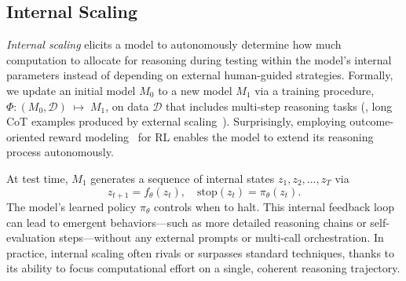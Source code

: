 \subsection{Internal Scaling}
\label{subsec:internalsclaing}
\textit{Internal scaling} elicits a model to autonomously determine how much computation to allocate for reasoning during testing within the model's internal parameters instead of depending on external human-guided strategies.
Formally, we update an initial model $M_{0}$ to a new model $M_{1}$ via a training procedure, $\Phi : (M_{0}, \mathcal{D}) \;\mapsto\; M_{1}$, on data $\mathcal{D}$ that includes multi-step reasoning tasks (\eg, long CoT examples produced by external scaling~\citep{GAIR-o1p1}).
Surprisingly, employing outcome-oriented reward modeling~\citep{deepseek-r1, openai-o1} for RL enables the model to extend its reasoning process autonomously. 

At test time, $M_{1}$ generates a sequence of internal states $z_{1}, z_{2}, \dots, z_{T}$ via
\begin{equation}
    z_{t+1} = f_{\theta}(z_t), 
  \quad
  \mathrm{stop}(z_t) = \pi_{\theta}(z_t).
\end{equation}
The model’s learned policy $\pi_{\theta}$ controls when to halt.
This internal feedback loop can lead to emergent behaviors—such as more detailed reasoning chains or self-evaluation steps—without any external prompts or multi-call orchestration. In practice, internal scaling often rivals or surpasses standard techniques, thanks to its ability to focus computational effort on a single, coherent reasoning trajectory.


